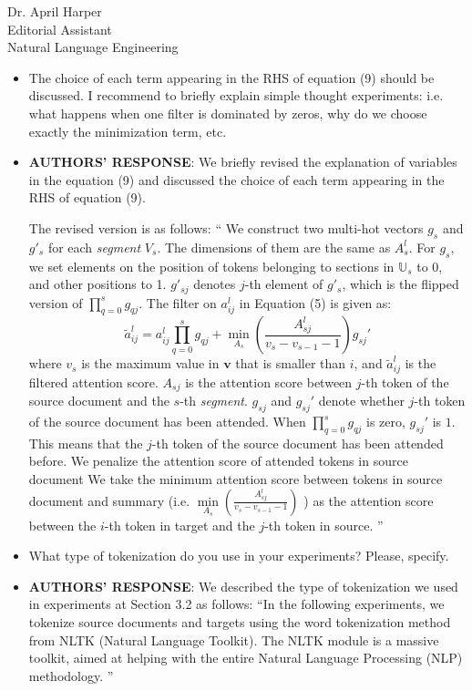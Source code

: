 \documentclass[11pt]{letter} %
\theoremstyle{definition}
\begin{document}
\begin{letter}{Dr. April Harper \\
            Editorial Assistant \\
			Natural Language Engineering}
\begin{enumerate}
\begin{itemize}
				\item The choice of each term appearing in the RHS of equation (9) should be discussed. I recommend to briefly explain simple thought experiments: i.e. what happens when one filter is dominated by zeros, why do we choose exactly the minimization term, etc.
				\item[] \textbf{AUTHORS' RESPONSE}: 
                We briefly revised the explanation of variables in the equation (9) and discussed the choice of each term appearing in the RHS of equation (9). 
				
				The revised version is as follows:  
				``
				We construct two multi-hot vectors $g_{s}$ and $g'_{s}$ for each \textit{segment} $V_{s}$.
				The dimensions of them are the
				same as $A_{s}^{l}$. For $g_{s}$, we set elements on the position of tokens
				belonging to sections in $\mathbb{U}_{s}$ to 0, and other
				positions to 1. 
				$g'_{sj}$ denotes $j$-th element of $g'_{s}$, which is the flipped version of $\prod \limits_{q=0}^{s}g_{qj}$. 
				The filter on $a_{ij}^{l}$ in Equation (5) is given as:
				\begin{equation}
					\tilde{a}_{ij}^{l} = a_{ij}^{l}\prod_{q=0}^{s}g_{qj} + \min \limits_{A_{s}}\left(\frac{A_{sj}^{l}}{v_{s}-v_{s-1}-1}\right)g_{sj}' \nonumber
				\end{equation}
				where $v_{s}$ is the maximum value in 
				$\mathbf{v}$ that is smaller than $i$,  and $\tilde{a}_{ij}^l$ is the filtered
				attention score. $A_{sj}$ is the attention score between $j$-th token
				of the source document and the $s$-th \textit{segment}. 
				$g_{sj}$ and $g_{sj}'$ denote whether $j$-th token
				of the source document has been attended.
				When $\prod \limits_{q=0}^{s}g_{qj}$ is zero, $g_{sj}'$ is $1$.
				This means that the $j$-th token of the source document has been attended before.
				We penalize the attention score of attended tokens in source document
				We take the minimum attention score between tokens in source document and summary 
				(i.e. $\min \limits_{A_{s}}\left(\frac{A_{sj}^{l}}{v_{s}-v_{s-1}-1}\right)$ )
				as the attention score between the $i$-th token in target and the $j$-th token in source.
                ''  
				
				\item What type of tokenization do you use in your experiments? Please, specify.
				\item[] \textbf{AUTHORS' RESPONSE}: 
				We described the type of tokenization we used in experiments at Section 3.2 as follows:
                ``In the following experiments, we tokenize source documents and targets 
				using the word tokenization method from NLTK (Natural Language Toolkit). 
				The NLTK module is a massive toolkit, 
				aimed at helping with the entire Natural Language Processing (NLP) methodology.
				''


\end{itemize}
\end{enumerate}
\end{letter}
\end{document}
